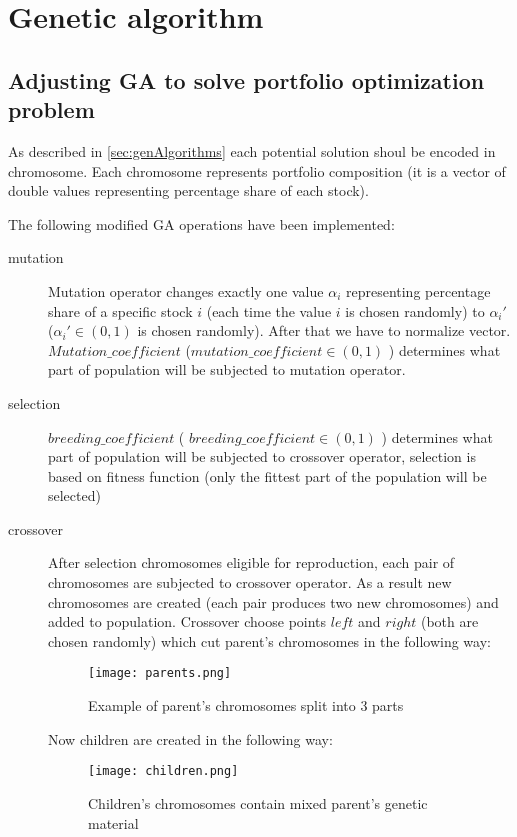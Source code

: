 \section{Genetic algorithm}
\label{sec:genAlgoImpl}

\subsection{Adjusting GA to solve portfolio optimization problem}

As described in \ref{sec:genAlgorithms} each potential solution shoul be encoded in chromosome. 
Each chromosome represents portfolio composition (it is a vector of double values representing percentage share of each stock).

The following modified GA operations have been implemented:
\begin{description}
  \item [mutation]
      Mutation operator changes exactly one value $ \alpha_{i} $ representing percentage share of a specific stock $i$ (each time the value $i$ is chosen randomly)
      to $\alpha_{i}'$ ($\alpha_{i}' \in (0,1)$ is chosen randomly). 
      After that we have to normalize vector.
      $Mutation\_coefficient$ ($mutation\_coefficient \in (0,1)$ ) determines what part of population will be subjected to mutation operator.
  \item [selection]
      $breeding\_coefficient$ ( $breeding\_coefficient \in (0,1)$ ) determines what part of population will be subjected to crossover operator, selection is based on 
      fitness function (only the fittest part of the population will be selected)
  \item [crossover]
      After selection chromosomes eligible for reproduction, each pair of chromosomes are subjected to crossover operator. As a result new chromosomes are created (each pair
      produces two new chromosomes) and added to population. Crossover choose points $left$  and $right$ (both are chosen randomly) which cut parent's chromosomes in the following
      way: 
	  \begin{figure}[H]
	    \begin{center}
	      \texttt{[image: parents.png]}
	    \end{center}
	    \caption{Example of parent's chromosomes split into 3 parts}
	  \end{figure}

	Now children are created in the following way:    
	  \begin{figure}[H]
	    \begin{center}
	      \texttt{[image: children.png]}
	    \end{center}
	    \caption{Children's chromosomes contain mixed parent's genetic material}
	  \end{figure}

\end{description}

